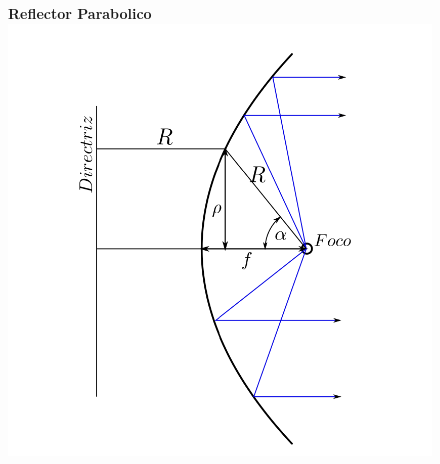 \documentclass[twocolumn, 8pt]{extarticle}
\begin{document}
\begin{figure}[H]
    \centering
    \textbf{Reflector Parabolico}
    \includegraphics[width=\columnwidth]{reflector.png}
\end{figure}
\end{document}
